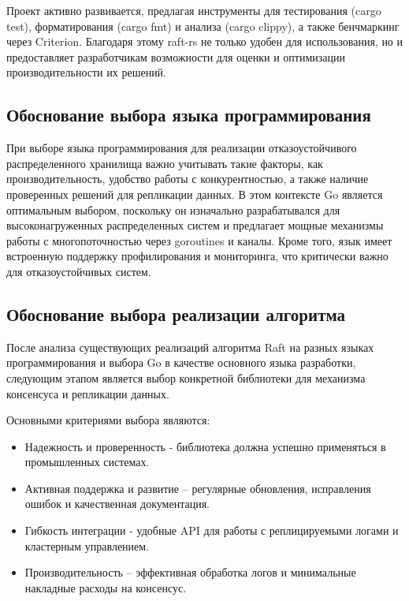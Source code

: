 Проект активно развивается, предлагая инструменты для тестирования (cargo test),
форматирования (cargo fmt) и анализа (cargo clippy), а также бенчмаркинг через
Criterion. Благодаря этому raft-rs не только удобен для использования, но и
предоставляет разработчикам возможности для оценки и оптимизации производительности их
решений.

\subsection{Обоснование выбора языка программирования}

При выборе языка программирования для реализации отказоустойчивого распределенного
хранилища важно учитывать такие факторы, как производительность, удобство работы с
конкурентностью, а также наличие проверенных решений для репликации данных. В этом
контексте Go \cite{golang} является оптимальным выбором, поскольку он изначально разрабатывался для
высоконагруженных распределенных систем и предлагает мощные механизмы работы с
многопоточностью через goroutines и каналы. Кроме того, язык имеет встроенную поддержку
профилирования и мониторинга, что критически важно для отказоустойчивых систем.

\subsection{Обоснование выбора реализации алгоритма}

После анализа существующих реализаций алгоритма Raft на разных языках программирования и
выбора Go в качестве основного языка разработки, следующим этапом является выбор
конкретной библиотеки для механизма консенсуса и репликации данных.

Основными критериями выбора являются:

\begin{itemize}
    \item Надежность и проверенность - библиотека должна успешно применяться в
    промышленных системах.
    \item Активная поддержка и развитие – регулярные обновления, исправления ошибок и
    качественная документация.
    \item Гибкость интеграции - удобные API для работы с реплицируемыми логами и
    кластерным управлением.
    \item Производительность – эффективная обработка логов и минимальные накладные
    расходы на консенсус.
\end{itemize}

